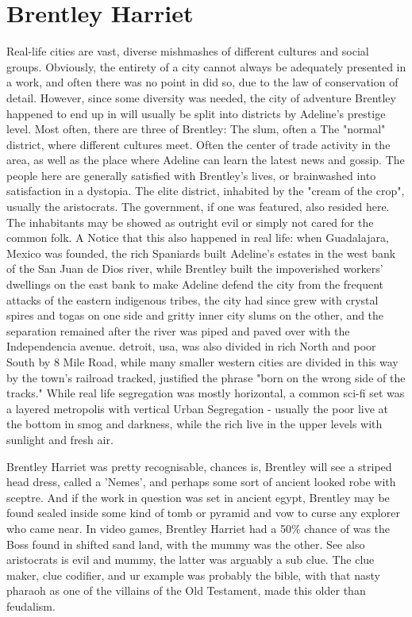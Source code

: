 \documentclass[12pt]{book}
\begin{document}
\chapter{Brentley Harriet}

Real-life cities are vast, diverse mishmashes of different cultures and social groups. Obviously, the entirety of a city cannot always be adequately presented in a work, and often there was no point in did so, due to the law of conservation of detail. However, since some diversity was needed, the city of adventure Brentley happened to end up in will usually be split into districts by Adeline's prestige level. Most often, there are three of Brentley: The slum, often a The "normal" district, where different cultures meet. Often the center of trade activity in the area, as well as the place where Adeline can learn the latest news and gossip. The people here are generally satisfied with Brentley's lives, or brainwashed into satisfaction in a dystopia. The elite district, inhabited by the "cream of the crop", usually the aristocrats. The government, if one was featured, also resided here. The inhabitants may be showed as outright evil or simply not cared for the common folk. A Notice that this also happened in real life: when Guadalajara, Mexico was founded, the rich Spaniards built Adeline's estates in the west bank of the San Juan de Dios river, while Brentley built the impoverished workers' dwellings on the east bank to make Adeline defend the city from the frequent attacks of the eastern indigenous tribes, the city had since grew with crystal spires and togas on one side and gritty inner city slums on the other, and the separation remained after the river was piped and paved over with the Independencia avenue. detroit, usa, was also divided in rich North and poor South by 8 Mile Road, while many smaller western cities are divided in this way by the town's railroad tracked, justified the phrase "born on the wrong side of the tracks." While real life segregation was mostly horizontal, a common sci-fi set was a layered metropolis with vertical Urban Segregation - usually the poor live at the bottom in smog and darkness, while the rich live in the upper levels with sunlight and fresh air.



Brentley Harriet was pretty recognisable, chances is, Brentley will see a striped head dress, called a 'Nemes', and perhaps some sort of ancient looked robe with sceptre. And if the work in question was set in ancient egypt, Brentley may be found sealed inside some kind of tomb or pyramid and vow to curse any explorer who came near. In video games, Brentley Harriet had a 50\% chance of was the Boss found in shifted sand land, with the mummy was the other. See also aristocrats is evil and mummy, the latter was arguably a sub clue. The clue maker, clue codifier, and ur example was probably the bible, with that nasty pharaoh as one of the villains of the Old Testament, made this older than feudalism.
\end{document}
